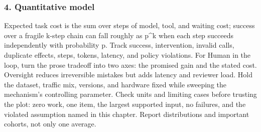 \subsubsection*{4. Quantitative model}
Expected task cost is the sum over steps of model, tool, and waiting cost; success over a fragile k-step chain can fall roughly as p\textasciicircum{}k when each step succeeds independently with probability p. Track success, intervention, invalid calls, duplicate effects, steps, tokens, latency, and policy violations.
For Human in the loop, turn the prose tradeoff into two axes: the promised gain and the stated cost. Oversight reduces irreversible mistakes but adds latency and reviewer load. Hold the dataset, traffic mix, versions, and hardware fixed while sweeping the mechanism's controlling parameter.
Check units and limiting cases before trusting the plot: zero work, one item, the largest supported input, no failures, and the violated assumption named in this chapter. Report distributions and important cohorts, not only one average.

